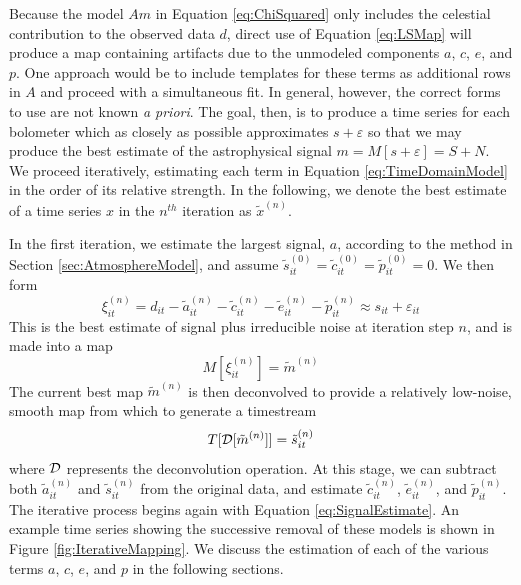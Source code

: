 \documentclass[12pt,preprint]{aastex}
\newcommand{\epsi}{\varepsilon}
\begin{document}
Because the model $Am$ in Equation \ref{eq:ChiSquared} only includes
the celestial contribution to the observed data $d$, direct use of
Equation \ref{eq:LSMap} will produce a map containing artifacts due to
the unmodeled components $a$, $c$, $e$, and $p$.  One approach would
be to include templates for these terms as additional rows in $A$ and
proceed with a simultaneous fit.  In general, however, the correct
forms to use are not known {\it a priori}.  The goal, then, is to
produce a time series for each bolometer which as closely as possible
approximates $s + \epsi$ so that we may produce the best estimate of
the astrophysical signal $m = M[s+\epsi] = S + N$.  We proceed
iteratively, estimating each term in Equation \ref{eq:TimeDomainModel}
in the order of its relative strength.  In the following, we denote
the best estimate of a time series $x$ in the $n^{th}$ iteration as
$\tilde{x}^{(n)}$.

In the first iteration, we estimate the largest signal, $a$, according
to the method in Section \ref{sec:AtmosphereModel}, and assume
$\tilde{s}^{(0)}_{it}=\tilde{c}^{(0)}_{it}=\tilde{p}^{(0)}_{it}=0$.
We then form
\begin{equation}
\label{eq:SignalEstimate}
\xi^{(n)}_{it} = d_{it} - \tilde{a}^{(n)}_{it} - \tilde{c}^{(n)}_{it}
- \tilde{e}^{(n)}_{it} - \tilde{p}^{(n)}_{it} \approx s_{it} +
\epsi_{it}
\end{equation}
This is the best estimate of signal plus irreducible noise at
iteration step $n$, and is made into a map
\begin{equation}
M[\xi^{(n)}_{it}] = \tilde{m}^{(n)}
\end{equation}
The current best map $\tilde{m}^{(n)}$ is then deconvolved to provide
a relatively low-noise, smooth map from which to generate a timestream
\begin{equation}
\label{eq:MapToTime}
T[{\cal D}[\tilde{m}^{(n)}]] = \tilde{s}^{(n)}_{it}
\end{equation}
where ${\cal D}$ represents the deconvolution operation.  At this
stage, we can subtract both $\tilde{a}^{(n)}_{it}$ and
$\tilde{s}^{(n)}_{it}$ from the original data, and estimate
$\tilde{c}^{(n)}_{it}$, $\tilde{e}^{(n)}_{it}$, and
$\tilde{p}^{(n)}_{it}$.  The iterative process begins again with
Equation \ref{eq:SignalEstimate}.  An example time series showing the
successive removal of these models is shown in Figure
\ref{fig:IterativeMapping}.  We discuss the estimation of each of the
various terms $a$, $c$, $e$, and $p$ in the following sections.
\end{document}
